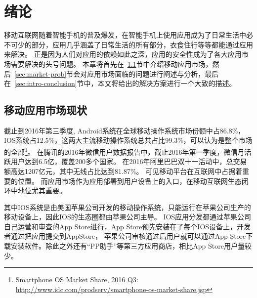 \chapter{绪论}
\label{chap:intro}

移动互联网随着智能手机的普及爆发，在智能手机上使用应用成为了日常生活中必不可少的部分，应用几乎涵盖了日常生活的所有部分，衣食住行等等都能通过应用来解决。
正是因为人们对应用的依赖如此之深，应用的安全性成为了各大应用市场需要解决的头号问题。
本章将首先在~\ref{sec:market-overview}节中介绍移动应用市场，然后~\ref{sec:market-prob}节会对应用市场面临的问题进行阐述与分析，最后在~\ref{sec:intro-conclusion}节中，本文将给出的解决方案进行一个大致的描述。

\section{移动应用市场现状}
\label{sec:market-overview}
截止到2016年第三季度, Android系统在全球移动操作系统市场份额中占86.8\%，IOS系统占12.5\%，这两大主流移动操作系统总共占比99.3\%，可以认为是整个市场的全部\footnote{Smartphone OS Market Share, 2016 Q3: \url{http://www.idc.com/prodserv/smartphone-os-market-share.jsp}}。
在腾讯的2016年微信用户数据报告中，截止2016年第一季度，微信月活跃用户达到6.5亿，覆盖200多个国家。
在2016年阿里巴巴双十一活动中，总交易额高达1207亿元，其中无线占比达到81.87\%。
可见移动平台在互联网中占据着重要的位置。
而应用市场作为应用部署到用户设备上的入口，在移动互联网生态闭环中地位尤其重要。

其中IOS系统是由美国苹果公司开发的移动操作系统，只能运行在苹果公司生产的移动设备上，因此IOS的生态圈都由苹果公司主导。
IOS应用分发都通过苹果公司自己运营和审查的App Store进行，App Store预先安装在了每个IOS设备上，开发者通过把应用提交到AppStore，
苹果公司审核通过后用户就可以通过App Store下载安装软件。除此之外还有“PP助手”等第三方应用商店，相比App Store用户量较少。


